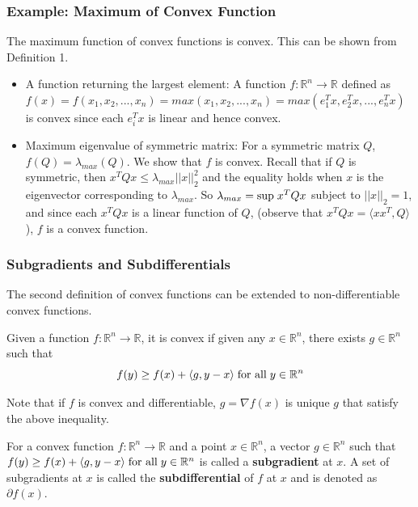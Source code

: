 \begin{frame}\frametitle{Example: Maximum of Convex Function}
    The maximum function of convex functions is convex. This can be shown from Definition 1.
    \begin{itemize}
        \item A function returning the largest element: 
        A function $f:\mathbb{R}^n \rightarrow \mathbb{R}$ defined as $f(x) = f(x_1, x_2, ... , x_n) = max(x_1, x_2, ... , x_n) = max(e_1^T x, e_2^T x, ... , e_n^T x)$ 
        is convex since each $e_i^T x$ is linear and hence convex.
        \item Maximum eigenvalue of symmetric matrix: For a symmetric matrix $Q$, $f(Q) = \lambda_{max} (Q)$. 
        We show that $f$ is convex. Recall that if $Q$ is symmetric, 
        then $x^{T}Qx \leq \lambda_{max} ||x||_2^2$ and the equality holds when $x$ is the eigenvector corresponding to $\lambda_{max}$. 
        So $\lambda_{max} = \text{sup}\hspace{1mm} x^T Qx$ subject to $||x||_2 = 1$, and since each $x^T Qx$ is a linear function of $Q$, 
        (observe that $x^T Qx = \langle x x^T, Q \rangle $), $f$ is a convex function.
    \end{itemize}
\end{frame}

\begin{frame}\frametitle{Subgradients and Subdifferentials}
    The second definition of convex functions can be extended to non-differentiable convex functions.
    \begin{definition}
        Given a function $f: \mathbb{R}^n \rightarrow \mathbb{R}$, it is convex if given any $x \in \mathbb{R}^n$, there exists $g \in \mathbb{R}^n$ such that
        \begin{equation*}
            f(y) \geq f(x)+ \langle g, y-x \rangle \hspace{1mm} \text{for all} \hspace{1mm} y \in \mathbb{R}^n
        \end{equation*}
    \end{definition}

    Note that if $f$ is convex and differentiable, $g=\nabla f(x)$ is unique $g$ that satisfy the above inequality.\\
    \begin{definition}
        For a convex function $f: \mathbb{R}^n \rightarrow \mathbb{R}$ and a point $x \in \mathbb{R}^n$, 
        a vector $g \in \mathbb{R}^n$ such that $ f(y) \geq f(x)+ \langle g, y-x \rangle \hspace{1mm} \text{for all} \hspace{1mm} y \in \mathbb{R}^n$ is called a \textbf{subgradient} at $x$. 
        A set of subgradients at $x$ is called the \textbf{subdifferential} of $f$ at $x$ and is denoted as $\partial f(x)$.
    \end{definition}
\end{frame}

